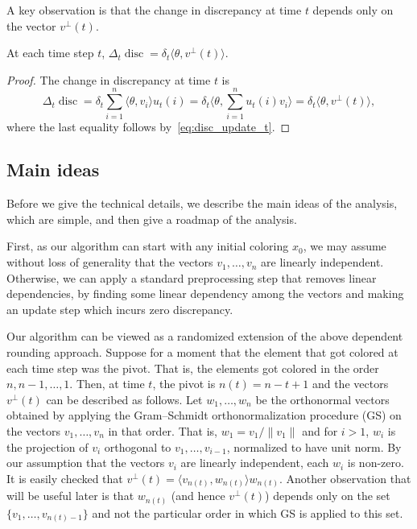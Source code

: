\documentclass{toc}
\DeclareMathOperator{\disc}{disc}   %
\begin{document}
A key observation is that the change in discrepancy at time $t$ depends only on
the vector $v^{\perp}(t)$.


\begin{lemma}
\label{lem:changedisc} At each time step $t$, $\Delta_t \disc = \delta_t \langle \theta, v^{\perp}(t)\rangle$.
\end{lemma}
\begin{proof}
The change in discrepancy at time $t$ is
\[\Delta_t \disc = \delta_t \sum_{i=1}^n \langle \theta,v_i \rangle u_t(i) =
\delta_t \langle \theta,  \sum_{i=1}^n u_t(i)v_i \rangle = \delta_t \langle
\theta, v^\perp(t) \rangle,
\]
where the last equality follows by~\eqref{eq:disc_update_t}.
\end{proof}


\subsection{Main ideas}
\label{sec:mainideas}

Before we give the technical details, we describe the main ideas of the analysis, which are simple, and then give a roadmap of the analysis.

First, as our algorithm can start with any initial coloring $x_0$, we may assume without loss of generality that the vectors $v_1,\ldots,v_n$ are linearly independent.
Otherwise, we can apply a standard preprocessing step that removes linear dependencies, by finding some linear dependency among the vectors and
making an update step which incurs zero discrepancy.

 Our algorithm can be viewed as a randomized extension of the above dependent rounding approach.
Suppose for a moment that the element that got colored at each time step was the pivot. That is, the elements got colored in the order $n,n-1,\ldots,1$. Then, at time $t$, the pivot is $n(t) = n-t+1$ and the vectors $v^{\perp}(t)$
can be described as follows. Let $w_1,\ldots,w_n$ be the orthonormal vectors
obtained by applying the Gram--Schmidt orthonormalization procedure (GS) on the vectors $v_1,\ldots,v_n$ in that order. That is, $w_1=v_1/\|v_1\|$ and for $i>1$, $w_i$ is the projection
of $v_i$ orthogonal to $v_1,\ldots,v_{i-1}$, normalized to have unit norm.
By our assumption that
the  %
vectors $v_i$ are linearly %
independent, each $w_i$ is non-zero. It is easily checked that $v^{\perp}(t) =
 \langle v_{n(t)},w_{n(t)} \rangle w_{n(t)}$.  Another observation that will be
useful later is that $w_{n(t)}$ (and hence $v^{\perp}(t)$) depends only on the
set $\{v_1,\ldots,v_{n(t)-1}\}$ and not the particular order in which GS is
applied to this set.
\end{document}
